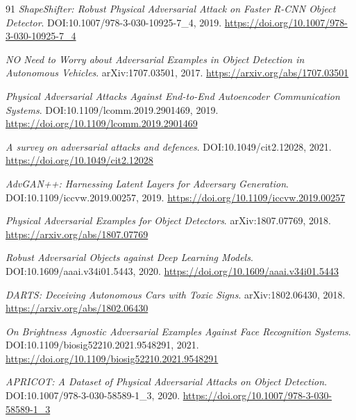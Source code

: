 \documentclass[11pt,a4paper]{article}
\begin{document}
\begin{thebibliography}{91}
\newblock \emph{ShapeShifter: Robust Physical Adversarial Attack on Faster R-CNN Object Detector}.
\newblock DOI:10.1007/978-3-030-10925-7\_4, 2019.
\newblock \url{https://doi.org/10.1007/978-3-030-10925-7_4}

\newblock \emph{NO Need to Worry about Adversarial Examples in Object Detection in Autonomous Vehicles}.
\newblock arXiv:1707.03501, 2017.
\newblock \url{https://arxiv.org/abs/1707.03501}

\newblock \emph{Physical Adversarial Attacks Against End-to-End Autoencoder Communication Systems}.
\newblock DOI:10.1109/lcomm.2019.2901469, 2019.
\newblock \url{https://doi.org/10.1109/lcomm.2019.2901469}

\newblock \emph{A survey on adversarial attacks and defences}.
\newblock DOI:10.1049/cit2.12028, 2021.
\newblock \url{https://doi.org/10.1049/cit2.12028}

\newblock \emph{AdvGAN++: Harnessing Latent Layers for Adversary Generation}.
\newblock DOI:10.1109/iccvw.2019.00257, 2019.
\newblock \url{https://doi.org/10.1109/iccvw.2019.00257}

\newblock \emph{Physical Adversarial Examples for Object Detectors}.
\newblock arXiv:1807.07769, 2018.
\newblock \url{https://arxiv.org/abs/1807.07769}

\newblock \emph{Robust Adversarial Objects against Deep Learning Models}.
\newblock DOI:10.1609/aaai.v34i01.5443, 2020.
\newblock \url{https://doi.org/10.1609/aaai.v34i01.5443}

\newblock \emph{DARTS: Deceiving Autonomous Cars with Toxic Signs}.
\newblock arXiv:1802.06430, 2018.
\newblock \url{https://arxiv.org/abs/1802.06430}

\newblock \emph{On Brightness Agnostic Adversarial Examples Against Face Recognition Systems}.
\newblock DOI:10.1109/biosig52210.2021.9548291, 2021.
\newblock \url{https://doi.org/10.1109/biosig52210.2021.9548291}

\newblock \emph{APRICOT: A Dataset of Physical Adversarial Attacks on Object Detection}.
\newblock DOI:10.1007/978-3-030-58589-1\_3, 2020.
\newblock \url{https://doi.org/10.1007/978-3-030-58589-1_3}


\end{thebibliography}
\end{document}
